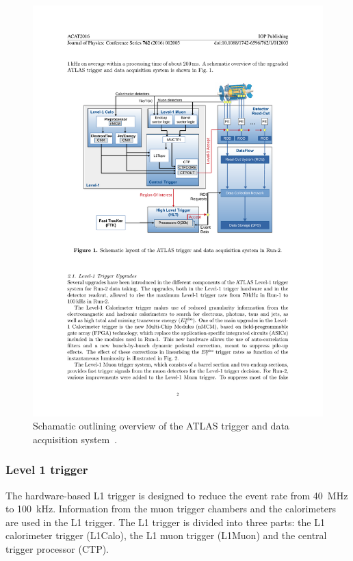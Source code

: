 \begin{figure}[]
    \centering
    \includegraphics[width=\largefigwidth]{images/TDAQ}
    \caption[Overview of the ATLAS trigger and data acquisition system]{Schamatic outlining overview of the ATLAS trigger and data acquisition system~\cite{ATLAS:TDAQ-Run2}.}
    \label{fig:method:ATLAS:TDAQ}
\end{figure}

\subsubsection{Level 1 trigger}
The hardware-based L1 trigger is designed to reduce the event rate from \SI{40}{\mega\hertz} to \SI{100}{\kilo\hertz}. Information from the muon trigger chambers and the calorimeters are used in the L1 trigger. The L1 trigger is divided into three parts: the L1 calorimeter trigger (L1Calo), the L1 muon trigger (L1Muon) and the central trigger processor (CTP).

